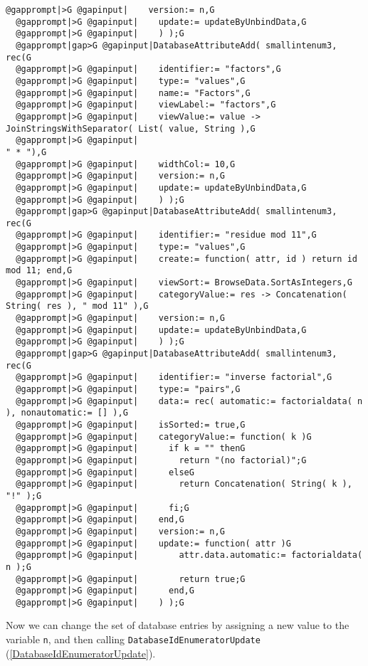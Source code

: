 \documentclass[a4paper,11pt]{report}
\begin{document}
{{\begin{Verbatim}[commandchars=@|G,fontsize=\small,frame=single,label=Example]
  @gapprompt|>G @gapinput|    version:= n,G
  @gapprompt|>G @gapinput|    update:= updateByUnbindData,G
  @gapprompt|>G @gapinput|    ) );G
  @gapprompt|gap>G @gapinput|DatabaseAttributeAdd( smallintenum3, rec(G
  @gapprompt|>G @gapinput|    identifier:= "factors",G
  @gapprompt|>G @gapinput|    type:= "values",G
  @gapprompt|>G @gapinput|    name:= "Factors",G
  @gapprompt|>G @gapinput|    viewLabel:= "factors",G
  @gapprompt|>G @gapinput|    viewValue:= value -> JoinStringsWithSeparator( List( value, String ),G
  @gapprompt|>G @gapinput|                                                   " * "),G
  @gapprompt|>G @gapinput|    widthCol:= 10,G
  @gapprompt|>G @gapinput|    version:= n,G
  @gapprompt|>G @gapinput|    update:= updateByUnbindData,G
  @gapprompt|>G @gapinput|    ) );G
  @gapprompt|gap>G @gapinput|DatabaseAttributeAdd( smallintenum3, rec(G
  @gapprompt|>G @gapinput|    identifier:= "residue mod 11",G
  @gapprompt|>G @gapinput|    type:= "values",G
  @gapprompt|>G @gapinput|    create:= function( attr, id ) return id mod 11; end,G
  @gapprompt|>G @gapinput|    viewSort:= BrowseData.SortAsIntegers,G
  @gapprompt|>G @gapinput|    categoryValue:= res -> Concatenation( String( res ), " mod 11" ),G
  @gapprompt|>G @gapinput|    version:= n,G
  @gapprompt|>G @gapinput|    update:= updateByUnbindData,G
  @gapprompt|>G @gapinput|    ) );G
  @gapprompt|gap>G @gapinput|DatabaseAttributeAdd( smallintenum3, rec(G
  @gapprompt|>G @gapinput|    identifier:= "inverse factorial",G
  @gapprompt|>G @gapinput|    type:= "pairs",G
  @gapprompt|>G @gapinput|    data:= rec( automatic:= factorialdata( n ), nonautomatic:= [] ),G
  @gapprompt|>G @gapinput|    isSorted:= true,G
  @gapprompt|>G @gapinput|    categoryValue:= function( k )G
  @gapprompt|>G @gapinput|      if k = "" thenG
  @gapprompt|>G @gapinput|        return "(no factorial)";G
  @gapprompt|>G @gapinput|      elseG
  @gapprompt|>G @gapinput|        return Concatenation( String( k ), "!" );G
  @gapprompt|>G @gapinput|      fi;G
  @gapprompt|>G @gapinput|    end,G
  @gapprompt|>G @gapinput|    version:= n,G
  @gapprompt|>G @gapinput|    update:= function( attr )G
  @gapprompt|>G @gapinput|        attr.data.automatic:= factorialdata( n );G
  @gapprompt|>G @gapinput|        return true;G
  @gapprompt|>G @gapinput|      end,G
  @gapprompt|>G @gapinput|    ) );G
\end{Verbatim}
 Now we can change the set of database entries by assigning a new value to the
variable \texttt{n}, and then calling \texttt{DatabaseIdEnumeratorUpdate} (\ref{DatabaseIdEnumeratorUpdate}). 
\begin{Verbatim}[commandchars=!@|,fontsize=\small,frame=single,label=Example]

\end{Verbatim}}}
\end{document}
